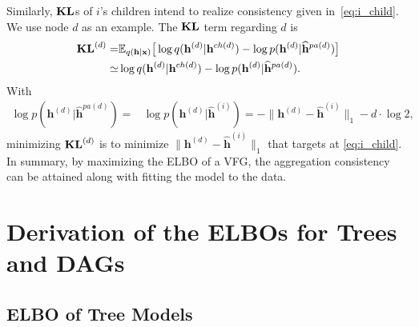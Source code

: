 \documentclass[sigconf, anonymous, review]{acmart}
\theoremstyle{plain}
\theoremstyle{definition}
\theoremstyle{remark}
\begin{document}
Similarly,  $\textbf{\text{KL}}$s  of $i$'s children intend to realize consistency given in~\eqref{eq:i_child}. We use node $d$ as an example.  The $\textbf{\text{KL}}$ term regarding $d$ is 
\begin{align*}%
\textbf{\text{KL}}^{(d)} = & \mathbb{E}_{q(\mathbf{h}|\mathbf{x})}\big[  \log q(\mathbf{h}^{(d)}|\mathbf{h}^{ch(d)})  - \log p(\mathbf{h}^{(d)}|\widehat{\mathbf{h}}^{pa(d)}) \big] \\
\simeq & \log q(\mathbf{h}^{(d)}|\mathbf{h}^{ch(d)})  - \log p(\mathbf{h}^{(d)}|\widehat{\mathbf{h}}^{pa(d)}).
\end{align*} 
With 
\begin{align*}%
 \log p(\mathbf{h}^{(d)}|\widehat{\mathbf{h}}^{pa(d)})= & \log p(\mathbf{h}^{(d)}|\widehat{\mathbf{h}}^{(i)})
 =  -\|\mathbf{h}^{(d)}- \widehat{\mathbf{h}}^{(i)}\|_1 - d\cdot\log2,
\end{align*} %
minimizing $\textbf{\text{KL}}^{(d)}$ is to minimize $\|\mathbf{h}^{(d)}- \widehat{\mathbf{h}}^{(i)}\|_1$ that targets at \eqref{eq:i_child}. In summary, by maximizing the ELBO of a VFG, the aggregation consistency can be  attained along with fitting the model to the data. 


\section{Derivation of the ELBOs for  Trees and DAGs }\label{sec:ebl_deri}
\subsection{ELBO of Tree Models}\label{appd:tree_elbo}
\end{document}
